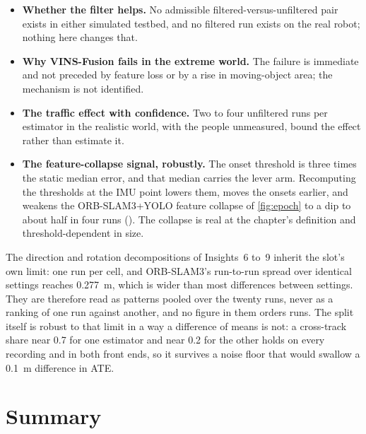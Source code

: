 \documentclass[11pt,a4paper,notitlepage]{report}
\begin{document}
\begin{itemize}
\item \textbf{Whether the filter helps.} No admissible filtered-versus-unfiltered
      pair exists in either simulated testbed, and no filtered run exists on the
      real robot; nothing here changes that.
\item \textbf{Why VINS-Fusion fails in the extreme world.} The failure is
      immediate and not preceded by feature loss or by a rise in moving-object
      area; the mechanism is not identified.
\item \textbf{The traffic effect with confidence.} Two to four unfiltered runs
      per estimator in the realistic world, with the people unmeasured, bound
      the effect rather than estimate it.
\item \textbf{The feature-collapse signal, robustly.} The onset threshold is
      three times the static median error, and that median carries the lever
      arm. Recomputing the thresholds at the IMU point lowers them, moves the
      onsets earlier, and weakens the ORB-SLAM3+YOLO feature collapse of
      \cref{fig:epoch} to a dip to about half in four runs
      (). The collapse is real at
      the chapter's definition and threshold-dependent in size.
\end{itemize}

The direction and rotation decompositions of Insights~6 to~9 inherit the slot's
own limit: one run per cell, and ORB-SLAM3's run-to-run spread over identical
settings reaches \SI{0.277}{\metre}, which is wider than most differences
between settings. They are therefore read as patterns pooled over the twenty
runs, never as a ranking of one run against another, and no figure in them
orders runs. The split itself is robust to that limit in a way a difference of
means is not: a cross-track share near \num{0.7} for one estimator and near
\num{0.2} for the other holds on every recording and in both front ends, so it
survives a noise floor that would swallow a \SI{0.1}{\metre} difference in ATE.

\section{Summary}
\end{document}

